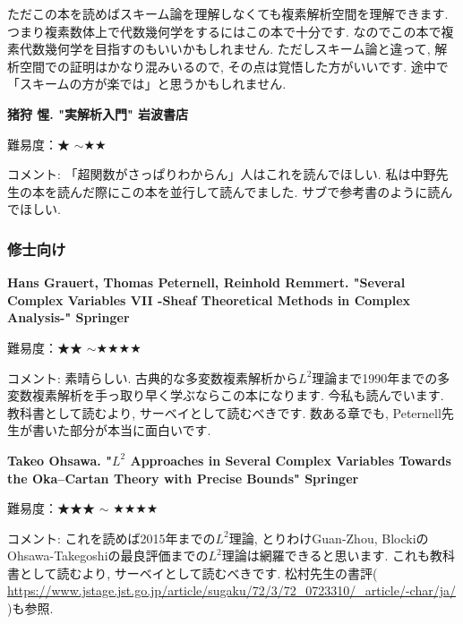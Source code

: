 ただこの本を読めばスキーム論を理解しなくても複素解析空間を理解できます. つまり複素数体上で代数幾何学をするにはこの本で十分です. なのでこの本で複素代数幾何学を目指すのもいいかもしれません. ただしスキーム論と違って, 解析空間での証明はかなり混みいるので, その点は覚悟した方がいいです. 途中で「スキームの方が楽では」と思うかもしれません. 
\vspace{8pt}


\textbf{猪狩 惺. "実解析入門" 岩波書店}  　\vspace{-6pt} 

難易度：★ $\sim$★★ 　\vspace{-6pt} 

コメント: 「超関数がさっぱりわからん」人はこれを読んでほしい. 
私は中野先生の本を読んだ際にこの本を並行して読んでました. 
サブで参考書のように読んでほしい. 

\subsubsection{修士向け}

\textbf{Hans Grauert, Thomas Peternell, Reinhold Remmert. "Several Complex Variables VII -Sheaf Theoretical Methods in Complex Analysis-" Springer}  　\vspace{-6pt} 

難易度：★★ $\sim$★★★★ 　\vspace{-6pt} 

コメント: 素晴らしい. 古典的な多変数複素解析から$L^2$理論まで1990年までの多変数複素解析を手っ取り早く学ぶならこの本になります. 今私も読んでいます. 教科書として読むより, サーベイとして読むべきです. 数ある章でも, Peternell先生が書いた部分が本当に面白いです. 
\vspace{8pt}

\textbf{Takeo Ohsawa.  "$L^2$ Approaches in Several Complex Variables
Towards the Oka–Cartan Theory with Precise Bounds" Springer}  　\vspace{-6pt} 

難易度：★★★ $\sim$ ★★★★  　\vspace{-6pt} 

コメント: これを読めば2015年までの$L^2$理論, とりわけGuan-Zhou, BlockiのOhsawa-Takegoshiの最良評価までの$L^2$理論は網羅できると思います. これも教科書として読むより, サーベイとして読むべきです.
松村先生の書評( \url{https://www.jstage.jst.go.jp/article/sugaku/72/3/72_0723310/_article/-char/ja/} )も参照. 
\vspace{8pt}

